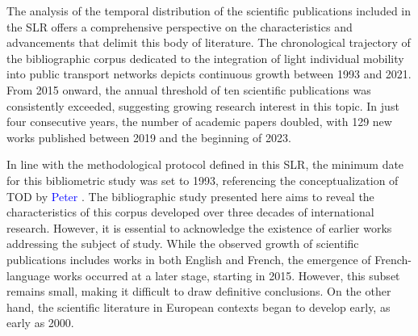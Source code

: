\begin{refsegment}
The analysis of the temporal distribution of the scientific publications included in the \acrshort{SLR} offers a comprehensive perspective on the characteristics and advancements that delimit this body of literature. The chronological trajectory of the bibliographic corpus dedicated to the integration of light individual mobility into public transport networks depicts continuous growth between 1993 and 2021. From 2015 onward, the annual threshold of ten scientific publications was consistently exceeded, suggesting growing research interest in this topic. In just four consecutive years, the number of academic papers doubled, with 129 new works published between 2019 and the beginning of 2023.%

In line with the methodological protocol defined in this \acrshort{SLR}, the minimum date for this bibliometric study was set to 1993, referencing the conceptualization of \acrshort{TOD} by \textcolor{blue}{Peter} \textcolor{blue}{\textcite{calthorpe_next_1993}}. The bibliographic study presented here aims to reveal the characteristics of this corpus developed over three decades of international research. However, it is essential to acknowledge the existence of earlier works addressing the subject of study. While the observed growth of scientific publications includes works in both English and French, the emergence of French-language works occurred at a later stage, starting in 2015. However, this subset remains small, making it difficult to draw definitive conclusions. On the other hand, the scientific literature in European contexts began to develop early, as early as 2000.%


\end{refsegment}

